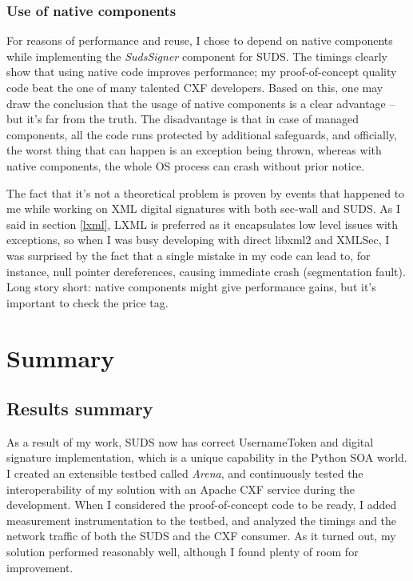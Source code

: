 \subsection{Use of native components}

For reasons of performance and reuse, I chose to depend on native components while implementing the \emph{SudsSigner} component for SUDS. The timings clearly show that using native code improves performance; my proof-of-concept quality code beat the one of many talented CXF developers. Based on this, one may draw the conclusion that the usage of native components is a clear advantage -- but it's far from the truth. The disadvantage is that in case of managed components, all the code runs protected by additional safeguards, and officially, the worst thing that can happen is an exception being thrown, whereas with native components, the whole OS process can crash without prior notice.

The fact that it's not a theoretical problem is proven by events that happened to me while working on XML digital signatures with both sec-wall and SUDS. As I said in section \ref{lxml}, LXML is preferred as it encapsulates low level issues with exceptions, so when I was busy developing with direct libxml2 and XMLSec, I was surprised by the fact that a single mistake in my code can lead to, for instance, null pointer dereferences, causing immediate crash (segmentation fault). Long story short: native components might give performance gains, but it's important to check the price tag.

\chapter{Summary}

\section{Results summary}

As a result of my work, SUDS now has correct UsernameToken and digital signature implementation, which is a unique capability in the Python SOA world. I created an extensible testbed called \emph{Arena}, and continuously tested the interoperability of my solution with an Apache CXF service during the development. When I considered the proof-of-concept code to be ready, I added measurement instrumentation to the testbed, and analyzed the timings and the network traffic of both the SUDS and the CXF consumer. As it turned out, my solution performed reasonably well, although I found plenty of room for improvement.

